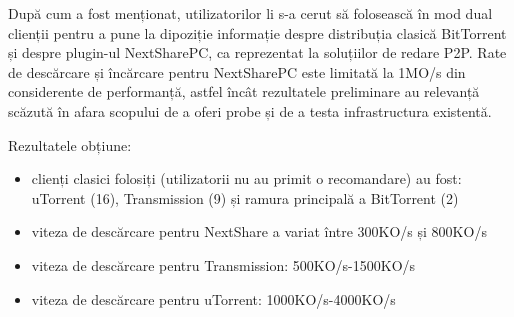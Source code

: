 După cum a fost menționat, utilizatorilor li s-a cerut să folosească în mod dual
clienții pentru a pune la dipoziție informație despre distribuția clasică
BitTorrent și despre plugin-ul NextSharePC, ca reprezentat la soluțiilor de
redare P2P. Rate de descărcare și încărcare pentru NextSharePC este limitată
la 1MO/s din considerente de performanță, astfel încât rezultatele preliminare
au relevanță scăzută în afara scopului de a oferi probe și de a testa
infrastructura existentă.


Rezultatele obțiune:
\begin{itemize}
  \item clienți clasici folosiți (utilizatorii nu au primit o recomandare)
  au fost: uTorrent (16), Transmission (9) și ramura principală a BitTorrent (2)
  \item viteza de descărcare pentru NextShare a variat între 300KO/s și 800KO/s
  \item viteza de descărcare pentru Transmission: 500KO/s-1500KO/s
  \item viteza de descărcare pentru uTorrent: 1000KO/s-4000KO/s
\end{itemize}

